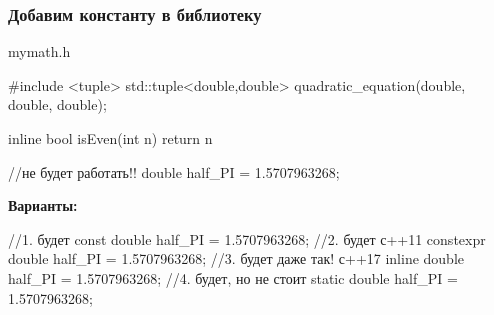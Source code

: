 \documentclass[9pt, aspectratio=1610]{beamer}
\begin{document}
\begin{frame}[fragile]\frametitle{Добавим константу в библиотеку}
	
	\begin{block}{mymath.h}
		\begin{cppcode}
			#include <tuple>
			std::tuple<double,double> quadratic_equation(double, double, double);
			
			inline bool isEven(int n) {
				return n %
			}
			
			//не будет работать!!
			double half_PI = 1.5707963268; 
		\end{cppcode}
	\end{block}
	
	\pause
	
	\textbf{Варианты:}
	
	\begin{cppcode}
		//1. будет
		const double half_PI = 1.5707963268; 
		//2. будет с++11
		constexpr double half_PI = 1.5707963268; 
		//3. будет даже так!  с++17
		inline double half_PI = 1.5707963268; 
		//4. будет, но не стоит
		static double half_PI = 1.5707963268; 
	\end{cppcode}
	
	
\end{frame}
\end{document}
